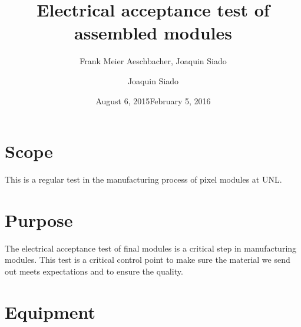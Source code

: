 \documentclass[12pt]{unlsilabsop}
\title{Electrical acceptance test of assembled modules}
\date{August 6, 2015}
\author{Frank Meier Aeschbacher, Joaquin Siado}
\date{February 5, 2016}
\author{Joaquin Siado}
\begin{document}
\maketitle

\section{Scope}
This is a regular test in the manufacturing process of pixel modules at UNL.

\section{Purpose}
The electrical acceptance test of final modules is a critical step in manufacturing modules. This test is a critical control point to make sure the material we send out meets expectations and to ensure the quality.



\section{Equipment}
\end{document}
